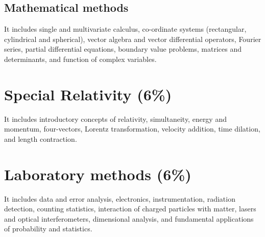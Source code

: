 \documentclass[12pt,a4paper]{article}
\begin{document}
\subsection{Mathematical methods}

It includes single and multivariate calculus, co-ordinate systems (rectangular, cylindrical and spherical), vector algebra and vector differential operators, Fourier series, partial differential equations, boundary value problems, matrices and determinants, and function of complex variables.


\section{Special Relativity (6\%)}

It includes introductory concepts of relativity, simultaneity, energy and momentum, four-vectors, Lorentz transformation, velocity addition, time dilation, and length contraction.

\section{Laboratory methods (6\%)}

It includes data and error analysis, electronics, instrumentation, radiation detection, counting statistics, interaction of charged particles with matter, lasers and optical interferometers, dimensional analysis, and fundamental applications of probability and statistics.
\end{document}
